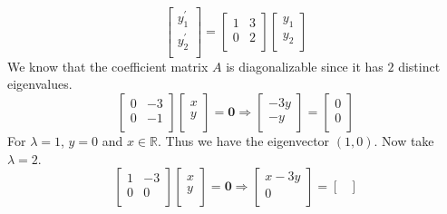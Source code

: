 \begin{longsolution}
\[
    \begin{bmatrix}
         y_1^{\prime}  \\
          y_2^{\prime} \\
    \end{bmatrix} = \begin{bmatrix}
        1 &3   \\
         0&2   \\
    \end{bmatrix} \begin{bmatrix}
         y_1 \\
          y_2\\
    \end{bmatrix}
\]
We know that the coefficient matrix \(A\) is diagonalizable since it has \(2\) distinct eigenvalues.
\[
    \begin{bmatrix}
        0 &-3   \\
         0& -1  \\
    \end{bmatrix} \begin{bmatrix}
         x \\
         y \\
    \end{bmatrix}= \mathbf{0} \Longrightarrow \begin{bmatrix}
        -3y    \\
        -y    \\
    \end{bmatrix} = \begin{bmatrix}
         0 \\
         0 \\
    \end{bmatrix}
\]
For \(\lambda =1\), \(y=0\) and \(x\in\mathbb{R} \). Thus we have the eigenvector \((1,0)\). Now take \(\lambda =2\).
\[
    \begin{bmatrix}
        1 &-3   \\
         0&  0 \\
    \end{bmatrix} \begin{bmatrix}
         x \\
         y \\
    \end{bmatrix}= \mathbf{0} \Longrightarrow \begin{bmatrix}
         x -3y \\
          0\\
    \end{bmatrix}=\begin{bmatrix}

\end{bmatrix}\]
\end{longsolution}
